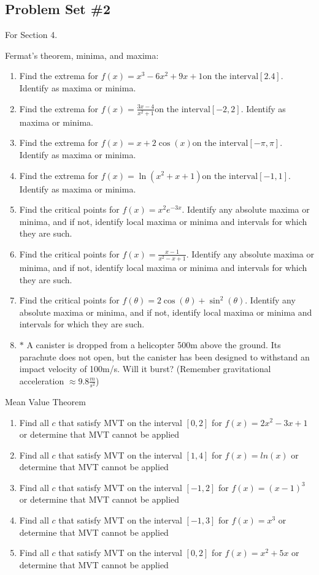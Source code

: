\documentclass[12pt]{amsart}
\begin{document}
\subsection{Problem Set \#2}  For Section 4.

Fermat's theorem, minima, and maxima:
\begin{enumerate}
\item Find the extrema for $f(x) = x^3 - 6x^2 + 9x + 1 \text{on the interval} [2. 4]$. Identify as maxima or minima.
\item Find the extrema for $f(x) = \frac{3x - 4}{x^2 + 1} \text{on the interval} [-2, 2]$. Identify as maxima or minima.
\item Find the extrema for $f(x) = x + 2 \cos(x) \text{on the interval} [-\pi, \pi]$. Identify as maxima or minima.
\item Find the extrema for $f(x) = \ln(x^2 + x + 1) \text{on the interval} [-1, 1]$. Identify as maxima or minima.
\item Find the critical points for $f(x) = x^2e^{-3x}$. Identify any absolute maxima or minima, and if not, identify local maxima or minima and intervals for which they are such.
\item Find the critical points for $f(x) = \frac{x - 1}{x^2 - x + 1}$. Identify any absolute maxima or minima, and if not, identify local maxima or minima and intervals for which they are such.
\item Find the critical points for $f(\theta) = 2 \cos(\theta) + \sin^2(\theta)$. Identify any absolute maxima or minima, and if not, identify local maxima or minima and intervals for which they are such. \\
\item $*$ A canister is dropped from a helicopter 500m above the ground. Its parachute does not open, but the canister has been designed to withstand an impact velocity of 100m/s. Will it burst? (Remember gravitational acceleration $\approx 9.8 \frac{m}{s^2}$)
\end{enumerate}
Mean Value Theorem
\begin{enumerate}[resume]
\item Find all $c$ that satisfy MVT on the interval $[0, 2]$ for $f(x) = 2x^2 - 3x + 1$ or determine that MVT cannot be applied
\item Find all $c$ that satisfy MVT on the interval $[1, 4]$ for $f(x) = ln(x)$ or determine that MVT cannot be applied
\item Find all $c$ that satisfy MVT on the interval $[-1, 2]$ for $f(x) = (x - 1)^3$ or determine that MVT cannot be applied
\item Find all $c$ that satisfy MVT on the interval $[-1, 3]$ for $f(x) = x^3$ or determine that MVT cannot be applied
\item Find all $c$ that satisfy MVT on the interval $[0, 2]$ for $f(x) = x^2 + 5x$ or determine that MVT cannot be applied \\
\end{enumerate}
\end{document}

